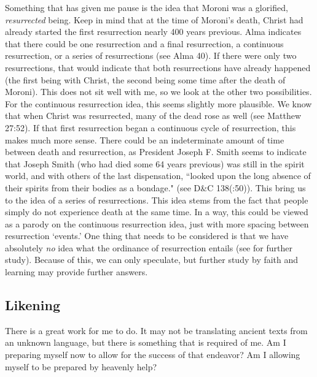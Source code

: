 \documentclass[12pt]{report}
\begin{document}
Something that has given me pause is the idea that Moroni was a glorified, \emph{resurrected} being.  Keep in mind that at the time of Moroni's death, Christ had already started the first resurrection nearly 400 years previous.  Alma indicates that there could be one resurrection and a final resurrection, a continuous resurrection, or a series of resurrections (see Alma 40).  If there were only two resurrections, that would indicate that both resurrections have already happened (the first being with Christ, the second being some time after the death of Moroni).  This does not sit well with me, so we look at the other two possibilities.  For the continuous resurrection idea, this seems slightly more plausible.  We know that when Christ was resurrected, many of the dead rose as well (see Matthew 27:52).  If that first resurrection began a continuous cycle of resurrection, this makes much more sense.  There could be an indeterminate amount of time between death and resurrection, as President Joseph F. Smith seems to indicate that Joseph Smith (who had died some 64 years previous) was still in the spirit world, and with others of the last dispensation, ``looked upon the long absence of their spirits from their bodies as a bondage." (see D\&C 138(:50)).  This bring us to the idea of a series of resurrections.  This idea stems from the fact that people simply do not experience death at the same time.  In a way, this could be viewed as a parody on the continuous resurrection idea, just with more spacing between resurrection `events.'  One thing that needs to be considered is that we have absolutely \emph{no} idea what the ordinance of resurrection entails (see  for further study).  Because of this, we can only speculate, but further study by faith and learning may provide further answers.

\subsection{Likening\label{intro:likening4}}
There is a great work for me to do.  It may not be translating ancient texts from an unknown language, but there is something that is required of me.  Am I preparing myself now to allow for the success of that endeavor?  Am I allowing myself to be prepared by heavenly help?
\end{document}
